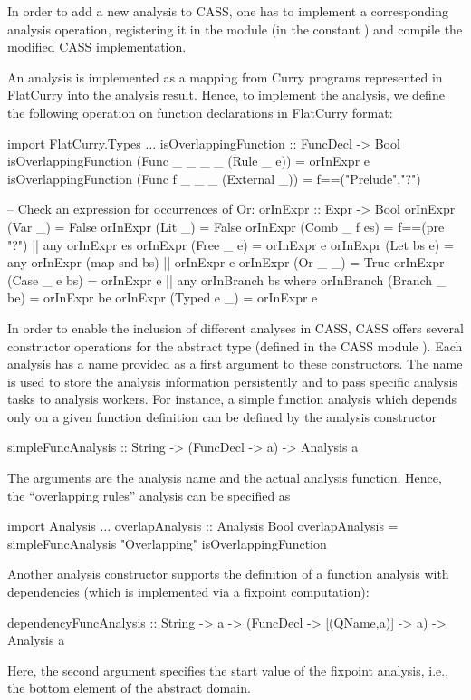 In order to add a new analysis to CASS, one has to implement
a corresponding analysis operation, registering it in the module
 (in the constant )
and compile the modified CASS implementation.

An analysis is implemented as a mapping from Curry programs
represented in FlatCurry into the analysis result.
Hence, to implement the  analysis, we define
the following operation on function declarations in FlatCurry format:
\begin{curry}
import FlatCurry.Types
$\ldots$
isOverlappingFunction :: FuncDecl -> Bool
isOverlappingFunction (Func _ _ _ _ (Rule _ e))   = orInExpr e
isOverlappingFunction (Func f _ _ _ (External _)) = f==("Prelude","?")

-- Check an expression for occurrences of Or:
orInExpr :: Expr -> Bool
orInExpr (Var _)       = False
orInExpr (Lit _)       = False
orInExpr (Comb _ f es) = f==(pre "?") || any orInExpr es
orInExpr (Free _ e)    = orInExpr e
orInExpr (Let bs e)    = any orInExpr (map snd bs) || orInExpr e
orInExpr (Or _ _)      = True
orInExpr (Case _ e bs) = orInExpr e || any orInBranch bs
                   where orInBranch (Branch _ be) = orInExpr be
orInExpr (Typed e _)   = orInExpr e
\end{curry}
%
In order to enable the inclusion of different analyses in CASS,
CASS offers several constructor operations for the abstract type 
(defined in the CASS module ).
Each analysis has a name provided as a first argument
to these constructors. The name is used to store the
analysis information persistently and to pass specific analysis tasks
to analysis workers.
For instance, a simple function analysis which depends only on a
given function definition can be defined by the
analysis constructor
\begin{curry}
simpleFuncAnalysis :: String -> (FuncDecl -> a) -> Analysis a
\end{curry}
The arguments are the analysis name and the actual analysis function.
Hence, the ``overlapping rules'' analysis can be specified as
\begin{curry}
import Analysis
$\ldots$
overlapAnalysis :: Analysis Bool
overlapAnalysis = simpleFuncAnalysis "Overlapping" isOverlappingFunction
\end{curry}
Another analysis constructor supports the definition
of a function analysis with dependencies (which is implemented via a fixpoint
computation):
\begin{curry}
dependencyFuncAnalysis :: String -> a -> (FuncDecl -> [(QName,a)] -> a)
                       -> Analysis a
\end{curry}
Here, the second argument specifies the start value of the fixpoint analysis,
i.e., the bottom element of the abstract domain.

